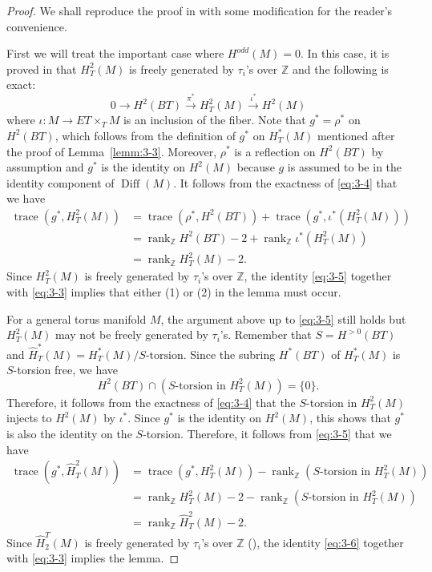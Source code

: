 \documentclass[12pt]{amsart}
\theoremstyle{plain} \numberwithin{equation}{section}
\theoremstyle{definition}
\def\Z{\mathbb Z}
\def\fg{g}
\renewcommand{\H}{\hat H}
\DeclareMathOperator{\rank}{rank}
\DeclareMathOperator{\Diff}{Diff}
\DeclareMathOperator{\trace}{trace}
\begin{document}
\begin{proof} 
We shall reproduce the proof in \cite{wiem12} with some modification for the reader's convenience.  

First we will treat the important case where $H^{odd}(M)=0$.  In this case, it is proved in \cite{masu99} that $H^2_T(M)$ is freely generated by $\tau_i$'s over $\Z$ and the following is exact:
\begin{equation} \label{eq:3-4}
0\to H^2(BT)\stackrel{\pi^*}\longrightarrow H^2_T(M)\stackrel{\iota^*}\longrightarrow H^2(M)
\end{equation}
where $\iota\colon M\to ET\times_TM$ is an inclusion of the fiber. Note that $\fg^*=\rho^*$ on $H^2(BT)$, which follows from the definition of $g^*$ on $H^*_T(M)$ mentioned after the proof of Lemma~\ref{lemm:3-3}. Moreover, $\rho^*$ is a reflection on $H^2(BT)$ by assumption and 
$\fg^*$ is the identity on $H^2(M)$ because $g$ is assumed to be in the identity component of $\Diff(M)$.  It follows from the exactness of \eqref{eq:3-4} that we have 
\begin{equation} \label{eq:3-5}
\begin{split}
\trace(\fg^*,H^2_T(M))&=\trace(\rho^*,H^2(BT))+\trace(\fg^*,\iota^*(H^2_T(M)))\\
&=\rank_\Z H^2(BT)-2+\rank_\Z \iota^*(H^2_T(M))\\
&=\rank_\Z H^2_T(M)-2.
\end{split}
\end{equation}
Since $H^2_T(M)$ is freely generated by $\tau_i$'s over $\Z$, the identity \eqref{eq:3-5} together with \eqref{eq:3-3} implies that either (1) or (2) in the lemma must occur. 

For a general torus manifold $M$, the argument above up to \eqref{eq:3-5} still holds but $H^2_T(M)$ may not be freely generated by $\tau_i$'s. Remember that $S=H^{>0}(BT)$ and $\H^*_T(M)=H^*_T(M)/S\text{-torsion}$. Since the subring $H^*(BT)$ of $H^*_T(M)$ is $S$-torsion free, we have 
\[
H^2(BT)\cap (S\text{-torsion in $H^2_T(M)$})=\{0\}.
\]
Therefore, it follows from the exactness of \eqref{eq:3-4} that the $S$-torsion in $H^2_T(M)$ injects to $H^2(M)$ by $\iota^*$.  Since $\fg^*$ is the identity on $H^2(M)$, this shows that $g^*$ is also the identity on the $S$-torsion.  Therefore, it follows from \eqref{eq:3-5} that we have 
\begin{equation} \label{eq:3-6}
\begin{split}
\trace(\fg^*,\H^2_T(M))&=\trace(\fg^*,H^2_T(M))-\rank_\Z(\text{$S$-torsion in $H^2_T(M)$})\\
&=\rank_\Z H^2_T(M)-2-\rank_\Z(\text{$S$-torsion in $H^2_T(M)$})\\
&=\rank_\Z \H^2_T(M)-2.
 \end{split}
 \end{equation}
 Since $\H_2^T(M)$ is freely generated by $\tau_i$'s over $\Z$ (\cite[Lemma 3.2]{masu99}), the identity \eqref{eq:3-6} together with \eqref{eq:3-3} implies the lemma.  
\end{proof}
\end{document}
